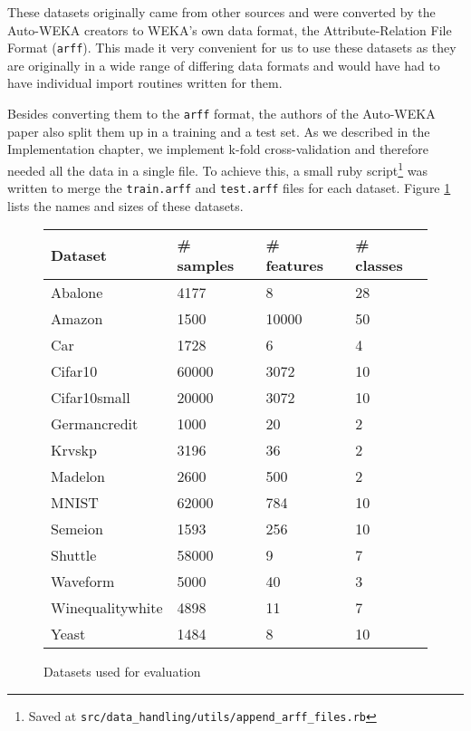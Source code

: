 \documentclass[a4paper,12pt,twoside,openright]{report}
\begin{document}
These datasets originally came from other sources \cite{Lichman:2013, Larochelle:2007:EED:1273496.1273556, Krizhevsky09learningmultiple} and were converted by the Auto-WEKA creators to WEKA's own data format, the Attribute-Relation File Format (\texttt{arff}). This made it very convenient for us to use these datasets as they are originally in a wide range of differing data formats and would have had to have individual import routines written for them. 

Besides converting them to the \texttt{arff} format, the authors of the Auto-WEKA paper also split them up in a training and a test set. As we described in the Implementation chapter, we implement k-fold cross-validation and therefore needed all the data in a single file. To achieve this, a small ruby script\footnote{Saved at \texttt{src/data\_handling/utils/append\_arff\_files.rb}} was written to merge the \texttt{train.arff} and \texttt{test.arff} files for each dataset. Figure \ref{datasets_info} lists the names and sizes of these datasets.


\begin{figure}
\centering

\begin{tabular}{|l|l|l|l|}
\hline
Dataset          & \# samples & \# features & \# classes \\ \hline\hline
Abalone          & 4177       & 8           & 28         \\ \hline
Amazon           & 1500       & 10000       & 50         \\ \hline
Car              & 1728       & 6           & 4          \\ \hline
Cifar10          & 60000      & 3072        & 10         \\ \hline
Cifar10small     & 20000      & 3072        & 10         \\ \hline
Germancredit     & 1000       & 20          & 2          \\ \hline
Krvskp           & 3196       & 36          & 2          \\ \hline
Madelon          & 2600       & 500         & 2          \\ \hline
MNIST            & 62000      & 784         & 10         \\ \hline
Semeion          & 1593       & 256         & 10         \\ \hline
Shuttle          & 58000      & 9           & 7          \\ \hline
Waveform         & 5000       & 40          & 3          \\ \hline
Winequalitywhite & 4898       & 11          & 7          \\ \hline
Yeast            & 1484       & 8           & 10         \\ \hline
\end{tabular}

\caption{Datasets used for evaluation}
\label{datasets_info}

\end{figure}
\end{document}
